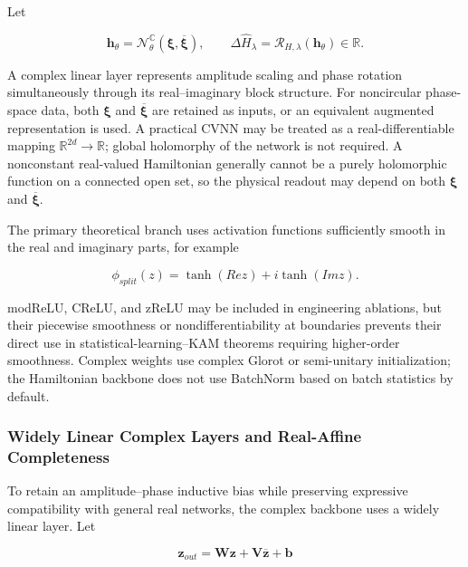 Let

\begin{equation}
\label{eq:chnn-4-6}
\mathbf{h}_{\theta} = \mathcal{N}_{\theta}^{\mathbb{C}}\left( \bm{\xi},\overline{\bm{\xi}} \right),\quad\quad\Delta{\widehat{H}}_{\lambda} = \mathcal{R}_{H,\lambda}\left( \mathbf{h}_{\theta} \right) \in \mathbb{R}.
\end{equation}

A complex linear layer represents amplitude scaling and phase rotation simultaneously through its real--imaginary block structure. For noncircular phase-space data, both \(\bm{\xi}\) and \(\overline{\bm{\xi}}\) are retained as inputs, or an equivalent augmented representation is used. A practical CVNN may be treated as a real-differentiable mapping \(\mathbb{R}^{2d}\rightarrow\mathbb{R}\); global holomorphy of the network is not required.\cite{Trabelsi2018DeepComplex,Hirose2012CVNN} A nonconstant real-valued Hamiltonian generally cannot be a purely holomorphic function on a connected open set, so the physical readout may depend on both \(\bm{\xi}\) and \(\overline{\bm{\xi}}\).

The primary theoretical branch uses activation functions sufficiently smooth in the real and imaginary parts, for example

\begin{equation}
\label{eq:chnn-4-7}
\phi_{split}(z) = \tanh(Rez) + i\tanh(Imz).
\end{equation}

modReLU, CReLU, and zReLU may be included in engineering ablations, but their piecewise smoothness or nondifferentiability at boundaries prevents their direct use in statistical-learning--KAM theorems requiring higher-order smoothness. Complex weights use complex Glorot or semi-unitary initialization; the Hamiltonian backbone does not use BatchNorm based on batch statistics by default.\cite{Trabelsi2018DeepComplex,Hirose2012CVNN}

\subsubsection{Widely Linear Complex Layers and Real-Affine Completeness}\label{sec:chnn-4-2-3}

To retain an amplitude--phase inductive bias while preserving expressive compatibility with general real networks, the complex backbone uses a widely linear layer. Let

\begin{equation}
\label{eq:chnn-4-8}
\mathbf{z}_{out} = \mathbf{W}\mathbf{z} + \mathbf{V}\overline{\mathbf{z}} + \mathbf{b}
\end{equation}

